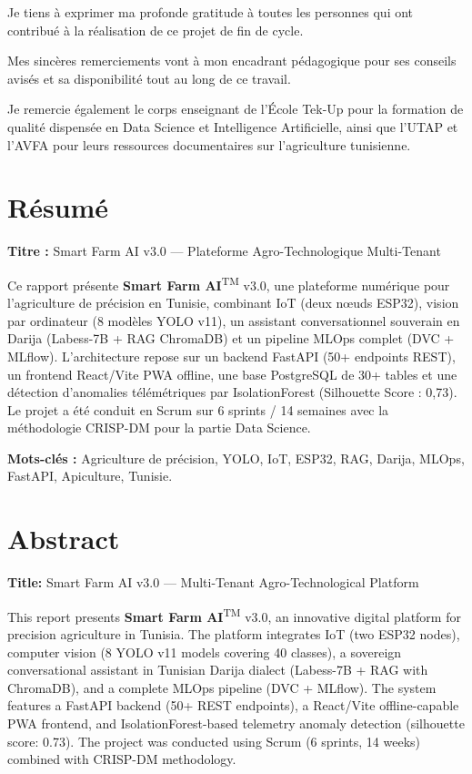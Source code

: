 \documentclass[12pt,a4paper,oneside]{report}
\newcommand{\farmAI}{\textbf{Smart Farm AI}\textsuperscript{TM}}
\begin{document}
Je tiens à exprimer ma profonde gratitude à toutes les personnes qui ont contribué à
la réalisation de ce projet de fin de cycle.

Mes sincères remerciements vont à mon encadrant pédagogique pour ses conseils avisés
et sa disponibilité tout au long de ce travail.

Je remercie également le corps enseignant de l'École Tek-Up pour la formation de
qualité dispensée en Data Science et Intelligence Artificielle, ainsi que l'UTAP et
l'AVFA pour leurs ressources documentaires sur l'agriculture tunisienne.

\clearpage

\chapter*{Résumé}\thispagestyle{empty}

\noindent\textbf{Titre :} Smart Farm AI v3.0 — Plateforme Agro-Technologique Multi-Tenant

\medskip
Ce rapport présente \farmAI{} v3.0, une plateforme numérique pour l'agriculture de
précision en Tunisie, combinant IoT (deux nœuds ESP32), vision par ordinateur (8 modèles
YOLO v11), un assistant conversationnel souverain en Darija (Labess-7B + RAG ChromaDB)
et un pipeline MLOps complet (DVC + MLflow). L'architecture repose sur un backend
FastAPI (50+ endpoints REST), un frontend React/Vite PWA offline, une base PostgreSQL
de 30+ tables et une détection d'anomalies télémétriques par IsolationForest
(Silhouette Score : 0,73). Le projet a été conduit en Scrum sur 6 sprints / 14 semaines
avec la méthodologie CRISP-DM pour la partie Data Science.

\medskip\noindent\textbf{Mots-clés :} Agriculture de précision, YOLO, IoT, ESP32, RAG, Darija, MLOps, FastAPI, Apiculture, Tunisie.

\clearpage

\chapter*{Abstract}\thispagestyle{empty}

\noindent\textbf{Title:} Smart Farm AI v3.0 — Multi-Tenant Agro-Technological Platform

\medskip
This report presents \farmAI{} v3.0, an innovative digital platform for precision
agriculture in Tunisia. The platform integrates IoT (two ESP32 nodes), computer vision
(8 YOLO v11 models covering 40 classes), a sovereign conversational assistant in Tunisian
Darija dialect (Labess-7B + RAG with ChromaDB), and a complete MLOps pipeline (DVC +
MLflow). The system features a FastAPI backend (50+ REST endpoints), a React/Vite
offline-capable PWA frontend, and IsolationForest-based telemetry anomaly detection
(silhouette score: 0.73). The project was conducted using Scrum (6 sprints, 14 weeks)
combined with CRISP-DM methodology.
\end{document}
